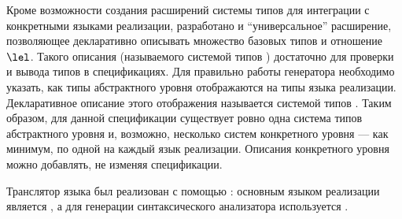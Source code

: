 Кроме возможности создания расширений системы типов для интеграции с конкретными языками реализации, разработано и ``универсальное'' расширение, позволяющее декларативно описывать множество базовых типов и отношение $\lel$. Такого описания (называемого системой типов ) достаточно для проверки и вывода типов в спецификациях. Для правильно работы генератора необходимо указать, как типы абстрактного уровня отображаются на типы языка реализации. Декларативное описание этого отображения называется системой типов .
Таким образом, для данной спецификации существует ровно одна система типов абстрактного уровня и, возможно, несколько систем конкретного уровня --- как минимум, по одной на каждый язык реализации. Описания конкретного уровня можно добавлять, не изменяя спецификации.

Транслятор языка \GRM{} был реализован с помощью \ATF{}: основным языком реализации является , а для генерации синтаксического анализатора используется .

